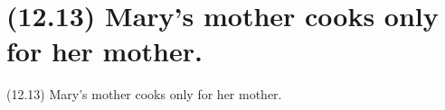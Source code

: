\documentclass{article}
\begin{document}
\clearpage

%
%

\section*{(12.13) Mary's mother cooks only for her mother.}

\bigbreak
\begin{enumerate*}
\item[(12.13)] Mary's mother cooks only for her mother.
\end{enumerate*}
\bigbreak
\end{document}
